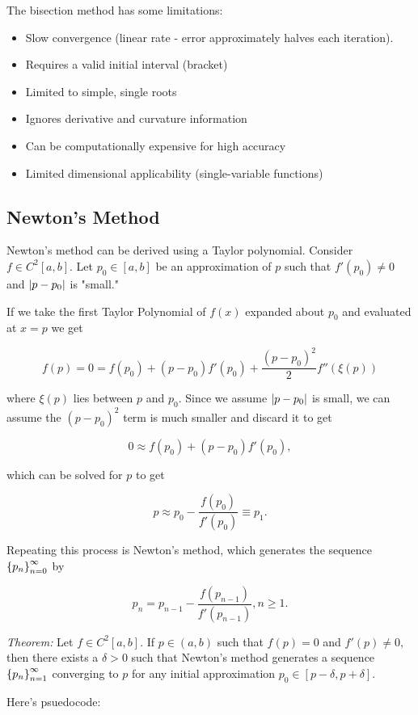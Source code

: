 \documentclass{article}
\begin{document}
The bisection method has some limitations:

\begin{itemize}
\item Slow convergence (linear rate - error approximately halves each iteration).
\item Requires a valid initial interval (bracket)
\item Limited to simple, single roots
\item Ignores derivative and curvature information
\item Can be computationally expensive for high accuracy
\item Limited dimensional applicability (single-variable functions)
\end{itemize}

\subsection{Newton's Method}

Newton's method can be derived using a Taylor polynomial. Consider $f \in C^2[a,b].$ Let $p_0 \in [a,b]$ be an approximation of $p$ such that $f'(p_0) \neq 0$ and $\left| p - p_0 \right|$ is "small."

If we take the first Taylor Polynomial of $f(x)$ expanded about $p_0$ and evaluated at $x = p$ we get

\[ f(p) = 0 = f(p_0) + (p - p_0)f'(p_0) + \frac{(p - p_0)^2}{2}f''(\xi(p)) \]

where $\xi(p)$ lies between $p$ and $p_0.$ Since we assume $\left| p - p_0 \right|$ is small, we can assume the $(p - p_0)^2$ term is much smaller and discard it to get

\[ 0 \approx f(p_0) + (p - p_0)f'(p_0), \]

which can be solved for $p$ to get

\[ p \approx p_0 - \frac{f(p_0)}{f'(p_0)} \equiv p_1. \]

Repeating this process is Newton's method, which generates the sequence $\left\{ p_n \right\}_{n=0}^{\infty}$ by

\[ p_n = p_{n-1} - \frac{f(p_{n-1})}{f'(p_{n-1})},  n \geq 1. \]

\emph{Theorem:} Let $f \in C^2[a, b].$ If $p \in (a, b)$ such that $f(p) = 0$ and $f'(p) \neq 0,$ then there exists a $\delta > 0$ such that Newton's method generates a \@{sequence} $\left\{ p_n \right\}_{n=1}^{\infty}$ converging to $p$ for any initial approximation $p_0 \in [p - \delta, p + \delta].$

Here's psuedocode:
\end{document}
